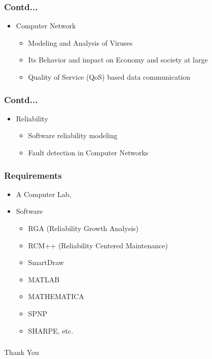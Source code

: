 \documentclass{beamer}
\begin{document}
\begin{frame}\frametitle{Contd...}
\begin{itemize}
\item Computer Network
\begin{itemize}
  \item Modeling and Analysis of Viruses
  \item Its Behavior and impact on Economy and society at large
  \item Quality of Service (QoS) based data communication
\end{itemize}
\end{itemize}
\end{frame}

\begin{frame}\frametitle{Contd...}
\begin{itemize}
\item Reliability
\begin{itemize}
  \item Software reliability modeling
  \item Fault detection in Computer Networks
\end{itemize}
\end{itemize}
\end{frame}

\begin{frame}\frametitle{Requirements}
\begin{itemize}
\item A Computer Lab,
\item Software
\begin{itemize}
  \item RGA (Reliability Growth Analysis)
  \item RCM++ (Reliability Centered Maintenance)
  \item  SmartDraw
  \item  MATLAB
  \item MATHEMATICA
  \item SPNP
  \item SHARPE, etc.
\end{itemize}
\end{itemize}
\end{frame}

\begin{frame}\frametitle{}
\Huge
\begin{center}Thank You \end{center}
\end{frame}
\end{document}

